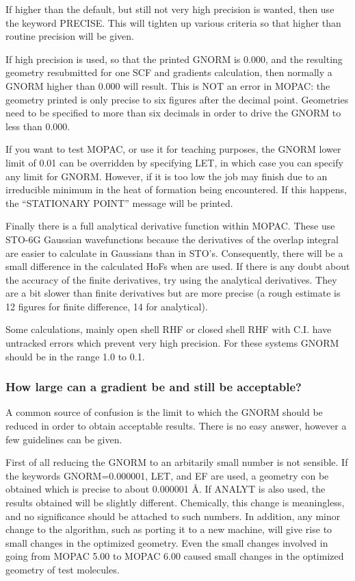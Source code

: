         If higher than the default, but still not very  high  precision  is
   wanted,  then  use  the  keyword  PRECISE.  This will tighten up various
   criteria so that higher than routine precision will be given.

        If high precision is used, so that the printed GNORM is 0.000,  and
   the   resulting   geometry   resubmitted   for  one  SCF  and  gradients
   calculation, then normally a GNORM higher than 0.000 will result.   This
   is  NOT  an error in MOPAC:  the geometry printed is only precise to six
   figures after the decimal point.  Geometries need  to  be  specified  to
   more than six decimals in order to drive the GNORM to less than 0.000.

        If you want to test MOPAC, or use it  for  teaching  purposes,  the
   GNORM  lower limit of 0.01 can be overridden by specifying LET, in which
   case you can specify any limit for GNORM.  However, if it is too low the
   job  may  finish  due to an irreducible minimum in the heat of formation
   being encountered.  If this happens, the ``STATIONARY POINT'' message will
   be printed.

        Finally there is  a  full  analytical  derivative  function  within
   MOPAC.   These use STO-6G Gaussian wavefunctions because the derivatives
   of the overlap integral are easier to calculate  in  Gaussians  than  in
   STO's.  Consequently, there will be a small difference in the calculated
   HoFs when  are used.  If  there  is  any  doubt
   about  the  accuracy of the finite derivatives, try using the analytical
   derivatives.  They are a bit slower than finite derivatives but are more
   precise  (a  rough  estimate is 12 figures for finite difference, 14 for
   analytical).

        Some calculations, mainly open shell RHF or closed shell  RHF  with
   C.I. have untracked errors which prevent very high precision.  For these
   systems GNORM should be in the range 1.0 to 0.1.

\subsubsection{How large can a gradient be and still be acceptable?}
        A common source of confusion is the limit to which the GNORM should
   be  reduced  in  order  to  obtain acceptable results.  There is no easy
   answer, however a few guidelines can be given.
 
      First of all reducing the GNORM to an arbitarily  small  number  is
 not  sensible.   If the keywords GNORM=0.000001, LET, and EF are used, a
 geometry con be obtained which is precise to about  0.000001 \AA.
 If ANALYT is also used, the results obtained will be slightly different.
 Chemically, this change is meaningless, and no  significance  should  be
 attached  to  such  numbers.   In  addition,  any  minor  change  to the
 algorithm, such as porting it to a new machine, will give rise to  small
 changes  in  the optimized geometry.  Even the small changes involved in
 going from MOPAC  5.00  to  MOPAC  6.00  caused  small  changes  in  the
 optimized geometry of test molecules.

